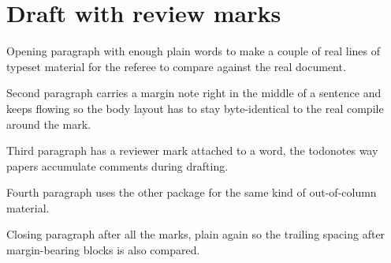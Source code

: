 \documentclass{article}
\begin{document}
\section{Draft with review marks}

Opening paragraph with enough plain words to make a couple of real lines of
typeset material for the referee to compare against the real document.

Second paragraph carries a margin note right in the
middle of a sentence and keeps flowing so the body layout has to stay
byte-identical to the real compile around the mark.

Third paragraph has a reviewer mark attached to a
word, the todonotes way papers accumulate comments during drafting.

Fourth paragraph uses the other package for the same
kind of out-of-column material.

Closing paragraph after all the marks, plain again so the trailing spacing
after margin-bearing blocks is also compared.
\end{document}
